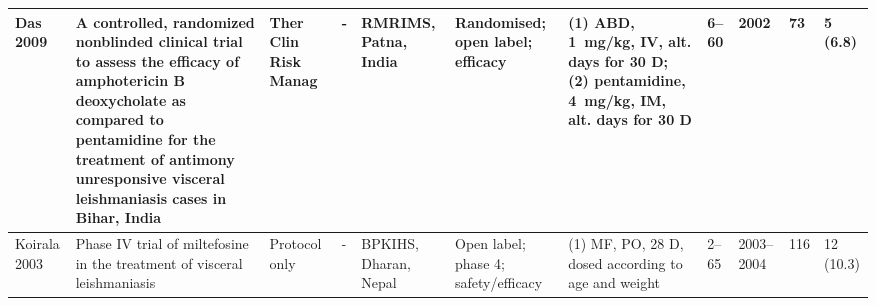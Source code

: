 \begin{ThreePartTable}
\begin{longtable}[c]{L{1.5cm} L{3.5cm} L{1.3cm} L{2.5cm} L{2.5cm} L{2.5cm} L{3cm} L{1.5cm} L{1cm} L{1cm} L{1.3cm}}
    Das 2009\cite{das2009}                          & A controlled, randomized nonblinded clinical trial to assess the efficacy of amphotericin B deoxycholate as compared to pentamidine for the treatment of antimony unresponsive visceral leishmaniasis cases in Bihar, India & Ther Clin Risk Manag     & -                                                                                    & RMRIMS, Patna, India                              & Randomised; open label; efficacy                                                   & (1) ABD, 1~mg/kg, IV, alt. days for 30 D; (2) pentamidine, 4~mg/kg, IM, alt. days for 30 D                                                                                                                            & 6--60       & 2002         & 73           & 5 (6.8)                                                                                                                                                                                                                                                                                                                                                                                                                                                                                                                                                                                        \\ \midrule
    Koirala 2003\cite{koirala2003}                  & Phase IV trial of miltefosine in the treatment of visceral leishmaniasis                                                                                                                                                    & Protocol only            & -                                                                                    & BPKIHS, Dharan, Nepal                             & Open label; phase 4; safety/efficacy                                               & (1) MF, PO, 28 D, dosed according to age and weight                                                                                                                                                        & 2--65       & 2003--2004   & 116          & 12 (10.3)                                                                                                                                                                                                                                                                                                                                                                                                                                                                                                                                                                                      \\ \midrule

\end{longtable}
\end{ThreePartTable}
